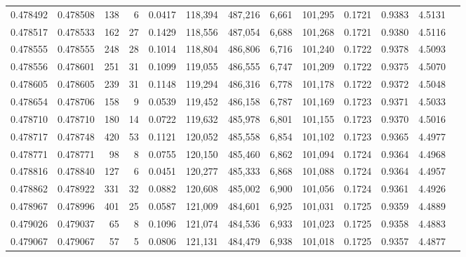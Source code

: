 \begin{tabular}{rrrrrrrrrrrrr}
0.478492 & 0.478508 &   138 &     6 &                                     0.0417 & 118,394 & 487,216 &   6,661 & 101,295 & 0.1721 & 0.9383 & 4.5131 \\
0.478517 & 0.478533 &   162 &    27 &                                     0.1429 & 118,556 & 487,054 &   6,688 & 101,268 & 0.1721 & 0.9380 & 4.5116 \\
0.478555 & 0.478555 &   248 &    28 &                                     0.1014 & 118,804 & 486,806 &   6,716 & 101,240 & 0.1722 & 0.9378 & 4.5093 \\
0.478556 & 0.478601 &   251 &    31 &                                     0.1099 & 119,055 & 486,555 &   6,747 & 101,209 & 0.1722 & 0.9375 & 4.5070 \\
0.478605 & 0.478605 &   239 &    31 &                                     0.1148 & 119,294 & 486,316 &   6,778 & 101,178 & 0.1722 & 0.9372 & 4.5048 \\
0.478654 & 0.478706 &   158 &     9 &                                     0.0539 & 119,452 & 486,158 &   6,787 & 101,169 & 0.1723 & 0.9371 & 4.5033 \\
0.478710 & 0.478710 &   180 &    14 &                                     0.0722 & 119,632 & 485,978 &   6,801 & 101,155 & 0.1723 & 0.9370 & 4.5016 \\
0.478717 & 0.478748 &   420 &    53 &                                     0.1121 & 120,052 & 485,558 &   6,854 & 101,102 & 0.1723 & 0.9365 & 4.4977 \\
0.478771 & 0.478771 &    98 &     8 &                                     0.0755 & 120,150 & 485,460 &   6,862 & 101,094 & 0.1724 & 0.9364 & 4.4968 \\
0.478816 & 0.478840 &   127 &     6 &                                     0.0451 & 120,277 & 485,333 &   6,868 & 101,088 & 0.1724 & 0.9364 & 4.4957 \\
0.478862 & 0.478922 &   331 &    32 &                                     0.0882 & 120,608 & 485,002 &   6,900 & 101,056 & 0.1724 & 0.9361 & 4.4926 \\
0.478967 & 0.478996 &   401 &    25 &                                     0.0587 & 121,009 & 484,601 &   6,925 & 101,031 & 0.1725 & 0.9359 & 4.4889 \\
0.479026 & 0.479037 &    65 &     8 &                                     0.1096 & 121,074 & 484,536 &   6,933 & 101,023 & 0.1725 & 0.9358 & 4.4883 \\
0.479067 & 0.479067 &    57 &     5 &                                     0.0806 & 121,131 & 484,479 &   6,938 & 101,018 & 0.1725 & 0.9357 & 4.4877 \\

\end{tabular}
